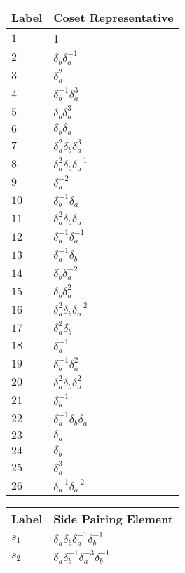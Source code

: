 \documentclass{article}
\begin{document}

\begin{center}
\begin{tabular}{ll}
\toprule
Label & Coset Representative\\
\midrule
$1$ & 1 \\
$2$ & $\delta_b^{}\delta_a^{-1}$ \\
$3$ & $\delta_a^{2}$ \\
$4$ & $\delta_b^{-1}\delta_a^{3}$ \\
$5$ & $\delta_b^{}\delta_a^{3}$ \\
$6$ & $\delta_b^{}\delta_a^{}$ \\
$7$ & $\delta_a^{2}\delta_b^{}\delta_a^{3}$ \\
$8$ & $\delta_a^{2}\delta_b^{}\delta_a^{-1}$ \\
$9$ & $\delta_a^{-2}$ \\
$10$ & $\delta_b^{-1}\delta_a^{}$ \\
$11$ & $\delta_a^{2}\delta_b^{}\delta_a^{}$ \\
$12$ & $\delta_b^{-1}\delta_a^{-1}$ \\
$13$ & $\delta_a^{-1}\delta_b^{}$ \\
$14$ & $\delta_b^{}\delta_a^{-2}$ \\
$15$ & $\delta_b^{}\delta_a^{2}$ \\
$16$ & $\delta_a^{2}\delta_b^{}\delta_a^{-2}$ \\
$17$ & $\delta_a^{2}\delta_b^{}$ \\
$18$ & $\delta_a^{-1}$ \\
$19$ & $\delta_b^{-1}\delta_a^{2}$ \\
$20$ & $\delta_a^{2}\delta_b^{}\delta_a^{2}$ \\
$21$ & $\delta_b^{-1}$ \\
$22$ & $\delta_a^{-1}\delta_b^{}\delta_a^{}$ \\
$23$ & $\delta_a^{}$ \\
$24$ & $\delta_b^{}$ \\
$25$ & $\delta_a^{3}$ \\
$26$ & $\delta_b^{-1}\delta_a^{-2}$ \\
\bottomrule
\end{tabular}
\hfill
\begin{tabular}{ll}
\toprule
Label & Side Pairing Element\\
\midrule
$s_{1}$ & $\delta_a^{}\delta_b^{}\delta_a^{-1}\delta_b^{-1}$ \\
$s_{2}$ & $\delta_a^{}\delta_b^{-1}\delta_a^{-3}\delta_b^{-1}$ \\

\end{tabular}
\end{center}
\end{document}
